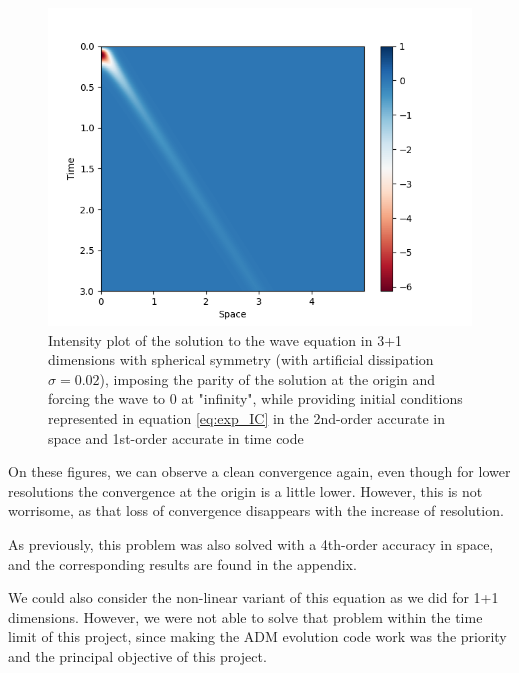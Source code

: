 \begin{figure}[t!]
    \centering
    \includegraphics[width=\columnwidth]{Images/spherical_wave-2nd_order-Intensity.png}
    \caption{Intensity plot of the solution to the wave equation in 3+1 dimensions with spherical symmetry (with artificial dissipation $\sigma = 0.02$), imposing the parity of the solution at the origin and forcing the wave to 0 at "infinity", while providing initial conditions represented in equation \eqref{eq:exp_IC} in the 2nd-order accurate in space and 1st-order accurate in time code}
    \label{fig:intensity_spherical_wave_2nd_order}
\end{figure}

On these figures, we can observe a clean convergence again, even though for lower resolutions the convergence at the origin is a little lower. However, this is not worrisome, as that loss of convergence disappears with the increase of resolution.

As previously, this problem was also solved with a 4th-order accuracy in space, and the corresponding results are found in the appendix.

We could also consider the non-linear variant of this equation as we did for 1+1 dimensions. However, we were not able to solve that problem within the time limit of this project, since making the ADM evolution code work was the priority and the principal objective of this project.